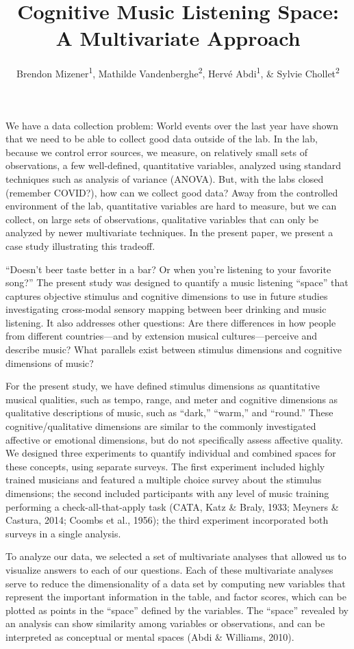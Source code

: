 \documentclass[
  english,
  man,floatsintext]{apa6}
\title{Cognitive Music Listening Space: A Multivariate Approach}
\author{Brendon Mizener\textsuperscript{1}, Mathilde Vandenberghe\textsuperscript{2}, Hervé Abdi\textsuperscript{1}, \& Sylvie Chollet\textsuperscript{2}}
\date{}
\affiliation{\vspace{0.5cm}\textsuperscript{1} University of Texas at Dallas\\\textsuperscript{2} Junia, Univ. Artois, Université de Liège, Univ. Littoral Côte d'Opale, UMRT 1158 BioEcoAgro, F-62000 Arras, France}
\begin{document}
\maketitle

We have a data collection problem: World events over the last year have shown that we need to be able to collect good data outside of the lab. In the lab, because we control error sources, we measure, on relatively small sets of observations, a few well-defined, quantitative variables, analyzed using standard techniques such as analysis of variance (ANOVA). But, with the labs closed (remember COVID?), how can we collect good data? Away from the controlled environment of the lab, quantitative variables are hard to measure, but we can collect, on large sets of observations, qualitative variables that can only be analyzed by newer multivariate techniques. In the present paper, we present a case study illustrating this tradeoff.

``Doesn't beer taste better in a bar? Or when you're listening to your favorite song?'' The present study was designed to quantify a music listening ``space'' that captures objective stimulus and cognitive dimensions to use in future studies investigating cross-modal sensory mapping between beer drinking and music listening. It also addresses other questions: Are there differences in how people from different countries---and by extension musical cultures---perceive and describe music? What parallels exist between stimulus dimensions and cognitive dimensions of music?

For the present study, we have defined stimulus dimensions as quantitative musical qualities, such as tempo, range, and meter and cognitive dimensions as qualitative descriptions of music, such as ``dark,'' ``warm,'' and ``round.'' These cognitive/qualitative dimensions are similar to the commonly investigated affective or emotional dimensions, but do not specifically assess affective quality. We designed three experiments to quantify individual and combined spaces for these concepts, using separate surveys. The first experiment included highly trained musicians and featured a multiple choice survey about the stimulus dimensions; the second included participants with any level of music training performing a check-all-that-apply task (CATA, Katz \& Braly, 1933; Meyners \& Castura, 2014; Coombs et al., 1956); the third experiment incorporated both surveys in a single analysis.

To analyze our data, we selected a set of multivariate analyses that allowed us to visualize answers to each of our questions. Each of these multivariate analyses serve to reduce the dimensionality of a data set by computing new variables that represent the important information in the table, and factor scores, which can be plotted as points in the ``space'' defined by the variables. The ``space'' revealed by an analysis can show similarity among variables or observations, and can be interpreted as conceptual or mental spaces (Abdi \& Williams, 2010).
\end{document}
